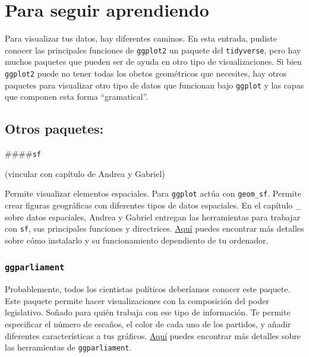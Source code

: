 \documentclass[]{book}
\begin{document}
\hypertarget{para-seguir-aprendiendo}{%
\section{Para seguir aprendiendo}\label{para-seguir-aprendiendo}}

Para visualizar tus datos, hay diferentes caminos. En esta entrada,
pudiste conocer las principales funciones de \texttt{ggplot2} un paquete
del \texttt{tidyverse}, pero hay muchos paquetes que pueden ser de ayuda
en otro tipo de visualizaciones. Si bien \texttt{ggplot2} puede no tener
todas los obetos geométricos que necesites, hay otros paquetes para
visualizar otro tipo de datos que funcionan bajo \texttt{ggplot} y las
capas que componen esta forma ``gramatical''.

\hypertarget{otros-paquetes}{%
\subsection{Otros paquetes:}\label{otros-paquetes}}

\#\#\#\#\texttt{sf}

(vincular con capítulo de Andrea y Gabriel)

Permite visualizar elementos espaciales. Para \texttt{ggplot} actúa con
\texttt{geom\_sf}. Permite crear figuras geográficas con diferentes
tipos de datos espaciales. En el capítulo \_ sobre datos espaciales,
Andrea y Gabriel entregan las herramientas para trabajar con
\texttt{sf}, sus principales funciones y directrices.
\href{https://github.com/r-spatial/sf}{Aquí} puedes encontrar más
detalles sobre cómo instalarlo y su funcionamiento dependiento de tu
ordenador.

\hypertarget{ggparliament}{%
\subsubsection{\texorpdfstring{\texttt{ggparliament}}{ggparliament}}\label{ggparliament}}

Probablemente, todos los cientistas políticos deberíamos conocer este
paquete. Este paquete permite hacer visualizaciones con la composición
del poder legislativo. Soñado para quién trabaja con ese tipo de
información. Te permite especificar el número de escaños, el color de
cada uno de los partidos, y añadir diferentes características a tus
gráficos. \href{https://github.com/RobWHickman/ggparliament}{Aquí}
puedes encontrar más detalles sobre las herramientas de
\texttt{ggparliament}.
\end{document}
